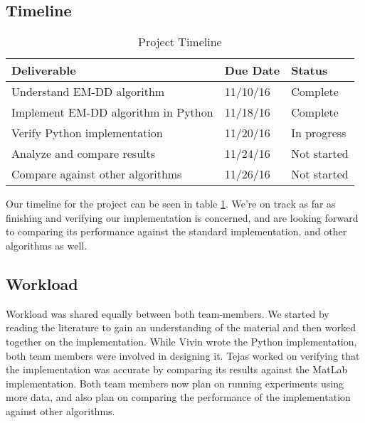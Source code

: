 \documentclass[conference]{IEEEtran}
\begin{document}
\subsection{Timeline}

\begin{table}[]
\centering
\caption{Project Timeline}
\label{timeline}
\begin{tabular}{|l|l|l|}
\hline
\rowcolor[HTML]{333333} 
{\color[HTML]{FFFFFF} Deliverable}  & {\color[HTML]{FFFFFF} Due Date} & {\color[HTML]{FFFFFF} Status} \\ \hline
Understand EM-DD algorithm          & 11/10/16                        & Complete                      \\ \hline
\rowcolor[HTML]{EFEFEF} 
Implement EM-DD algorithm in Python & 11/18/16                        & Complete                      \\ \hline
Verify Python implementation        & 11/20/16                        & In progress                   \\ \hline
\rowcolor[HTML]{EFEFEF} 
Analyze and compare results         & 11/24/16                        & Not started                   \\ \hline
Compare against other algorithms    & 11/26/16                        & Not started                   \\ \hline
\end{tabular}
\end{table}

Our timeline for the project can be seen in table \ref{timeline}. We're on track as far as finishing and verifying our implementation is concerned, and are looking forward to comparing its performance against the standard implementation, and other algorithms as well.

\subsection{Workload}

Workload was shared equally between both team-members. We started by reading the literature to gain an understanding of the material and then worked together on the implementation. While Vivin wrote the Python implementation, both team members were involved in designing it. Tejas worked on verifying that the implementation was accurate by comparing its results against the MatLab implementation. Both team members now plan on running experiments using more data, and also plan on comparing the performance of the implementation against other algorithms.
\end{document}
